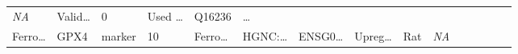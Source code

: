 \documentclass[
]{article}
\begin{document}
\begin{longtable}[]{@{}lllllllllllllll@{}}
\begin{minipage}[t]{0.05\columnwidth}
\emph{NA}\strut
\end{minipage} & \begin{minipage}[t]{0.05\columnwidth}\raggedright
Valid\ldots{}\strut
\end{minipage} & \begin{minipage}[t]{0.05\columnwidth}\raggedright
0\strut
\end{minipage} & \begin{minipage}[t]{0.05\columnwidth}\raggedright
Used \ldots{}\strut
\end{minipage} & \begin{minipage}[t]{0.05\columnwidth}\raggedright
Q16236\strut
\end{minipage} & \begin{minipage}[t]{0.02\columnwidth}\raggedright
\ldots{}\strut
\end{minipage}\tabularnewline
\begin{minipage}[t]{0.05\columnwidth}\raggedright
Ferro\ldots{}\strut
\end{minipage} & \begin{minipage}[t]{0.04\columnwidth}\raggedright
GPX4\strut
\end{minipage} & \begin{minipage}[t]{0.04\columnwidth}\raggedright
marker\strut
\end{minipage} & \begin{minipage}[t]{0.02\columnwidth}\raggedright
10\strut
\end{minipage} & \begin{minipage}[t]{0.05\columnwidth}\raggedright
Ferro\ldots{}\strut
\end{minipage} & \begin{minipage}[t]{0.05\columnwidth}\raggedright
HGNC:\ldots{}\strut
\end{minipage} & \begin{minipage}[t]{0.05\columnwidth}\raggedright
ENSG0\ldots{}\strut
\end{minipage} & \begin{minipage}[t]{0.05\columnwidth}\raggedright
Upreg\ldots{}\strut
\end{minipage} & \begin{minipage}[t]{0.04\columnwidth}\raggedright
Rat\strut
\end{minipage} & \begin{minipage}[t]{0.05\columnwidth}\raggedright
\emph{NA}\strut
\end{minipage} & \begin{minipage}[t]{0.05\columnwidth}\raggedright

\end{minipage}
\end{longtable}
\end{document}
